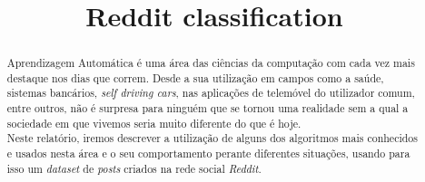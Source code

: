\documentclass[conference]{IEEEtran}
\begin{document}
\title{Reddit classification}

\author{
\and
{}
}

\maketitle

\begin{abstract}
Aprendizagem Automática é uma área das ciências da computação com cada vez mais destaque nos dias que correm. Desde a sua utilização em campos como a saúde, sistemas bancários, \textit{self driving cars}, nas aplicações de telemóvel do utilizador comum, entre outros, não é surpresa para ninguém que se tornou uma realidade sem a qual a sociedade em que vivemos seria muito diferente do que é hoje. \\
Neste relatório, iremos descrever a utilização de alguns dos algoritmos mais conhecidos e usados nesta área e o seu comportamento perante diferentes situações, usando para isso um \textit{dataset} de \textit{posts} criados na rede social \textit{Reddit}.

\end{abstract}













\end{document}
